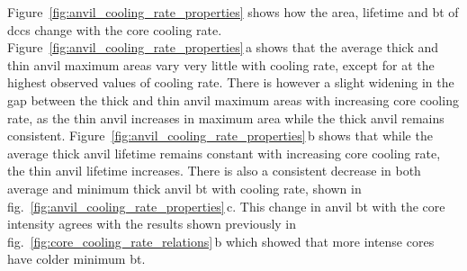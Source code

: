 Figure~\ref{fig:anvil_cooling_rate_properties} shows how the area, lifetime and \acrshort{bt} of \acrshort{dcc}s change with the core cooling rate.
Figure~\ref{fig:anvil_cooling_rate_properties}\,a shows that the average thick and thin anvil maximum areas vary very little with cooling rate, except for at the highest observed values of cooling rate.
There is however a slight widening in the gap between the thick and thin anvil maximum areas with increasing core cooling rate, as the thin anvil increases in maximum area while the thick anvil remains consistent.
Figure~\ref{fig:anvil_cooling_rate_properties}\,b shows that while the average thick anvil lifetime remains constant with increasing core cooling rate, the thin anvil lifetime increases.
There is also a consistent decrease in both average and minimum thick anvil \acrshort{bt} with cooling rate, shown in fig.~\ref{fig:anvil_cooling_rate_properties}\,c.
This change in anvil \acrshort{bt} with the core intensity agrees with the results shown previously in fig.~\ref{fig:core_cooling_rate_relations}\,b which showed that more intense cores have colder minimum \acrshort{bt}.

